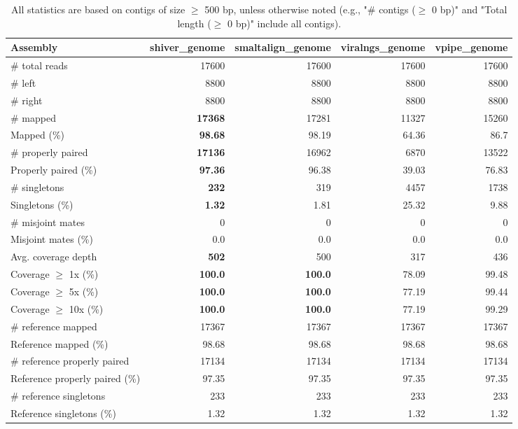 \documentclass[12pt,a4paper]{article}
\begin{document}
\begin{table}[ht]
\begin{center}
\caption{All statistics are based on contigs of size $\geq$ 500 bp, unless otherwise noted (e.g., "\# contigs ($\geq$ 0 bp)" and "Total length ($\geq$ 0 bp)" include all contigs).}
\begin{tabular}{|l*{4}{|r}|}
\hline
Assembly & shiver\_genome & smaltalign\_genome & viralngs\_genome & vpipe\_genome \\ \hline
\# total reads & 17600 & 17600 & 17600 & 17600 \\ \hline
\# left & 8800 & 8800 & 8800 & 8800 \\ \hline
\# right & 8800 & 8800 & 8800 & 8800 \\ \hline
\# mapped & {\bf 17368} & 17281 & 11327 & 15260 \\ \hline
Mapped (\%) & {\bf 98.68} & 98.19 & 64.36 & 86.7 \\ \hline
\# properly paired & {\bf 17136} & 16962 & 6870 & 13522 \\ \hline
Properly paired (\%) & {\bf 97.36} & 96.38 & 39.03 & 76.83 \\ \hline
\# singletons & {\bf 232} & 319 & 4457 & 1738 \\ \hline
Singletons (\%) & {\bf 1.32} & 1.81 & 25.32 & 9.88 \\ \hline
\# misjoint mates & 0 & 0 & 0 & 0 \\ \hline
Misjoint mates (\%) & 0.0 & 0.0 & 0.0 & 0.0 \\ \hline
Avg. coverage depth & {\bf 502} & 500 & 317 & 436 \\ \hline
Coverage $\geq$ 1x (\%) & {\bf 100.0} & {\bf 100.0} & 78.09 & 99.48 \\ \hline
Coverage $\geq$ 5x (\%) & {\bf 100.0} & {\bf 100.0} & 77.19 & 99.44 \\ \hline
Coverage $\geq$ 10x (\%) & {\bf 100.0} & {\bf 100.0} & 77.19 & 99.29 \\ \hline
\# reference mapped & 17367 & 17367 & 17367 & 17367 \\ \hline
Reference mapped (\%) & 98.68 & 98.68 & 98.68 & 98.68 \\ \hline
\# reference properly paired & 17134 & 17134 & 17134 & 17134 \\ \hline
Reference properly paired (\%) & 97.35 & 97.35 & 97.35 & 97.35 \\ \hline
\# reference singletons & 233 & 233 & 233 & 233 \\ \hline
Reference singletons (\%) & 1.32 & 1.32 & 1.32 & 1.32 \\ \hline

\end{tabular}
\end{center}
\end{table}
\end{document}
